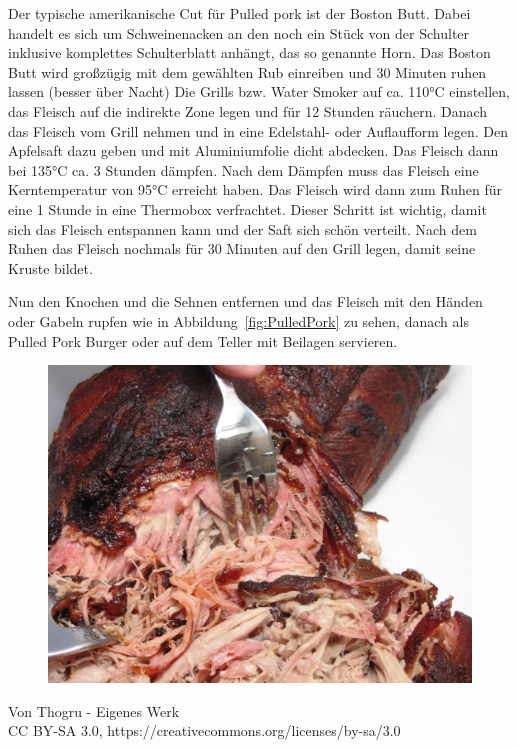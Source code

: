 Der typische amerikanische Cut für Pulled pork ist der Boston Butt. Dabei 
handelt es sich um Schweinenacken an den noch ein Stück von der 
Schulter  inklusive komplettes Schulterblatt anhängt, das so genannte 
Horn.
Das Boston Butt wird großzügig mit dem gewählten Rub einreiben und 30 
Minuten ruhen lassen (besser über Nacht) Die Grills bzw. Water Smoker 
auf ca. 110°C einstellen, das Fleisch auf die indirekte Zone legen und für 
12 Stunden räuchern. Danach das Fleisch vom Grill nehmen und in eine 
Edelstahl- oder Auflaufform legen. Den Apfelsaft dazu geben und mit 
Aluminiumfolie dicht abdecken. Das Fleisch dann bei 135°C ca. 3 Stunden 
dämpfen. Nach dem Dämpfen muss das Fleisch eine Kerntemperatur von 
95°C erreicht haben. Das Fleisch wird dann zum Ruhen für eine 1 Stunde 
in eine Thermobox verfrachtet. Dieser Schritt ist wichtig, damit sich das
Fleisch entspannen kann und der Saft sich schön verteilt. Nach dem 
Ruhen das Fleisch nochmals für 30 Minuten auf den Grill legen, damit 
seine Kruste bildet.

Nun den Knochen und die Sehnen entfernen und das Fleisch mit den 
Händen oder Gabeln rupfen wie in Abbildung~\vref{fig:PulledPork} zu 
sehen, danach als Pulled Pork Burger oder auf dem Teller mit Beilagen 
servieren.
\newpage
\begin{figure}[htbp]
		\centering
		\begin{minipage}{1\textwidth}
		\centering
		\includegraphics[width=1\linewidth]{pics/Pulled_Pork}
		\label{fig:PulledPork}
	\end{minipage}
\end{figure}
Von Thogru - Eigenes Werk\\
CC BY-SA 3.0, https://creativecommons.org/licenses/by-sa/3.0
\newpage

